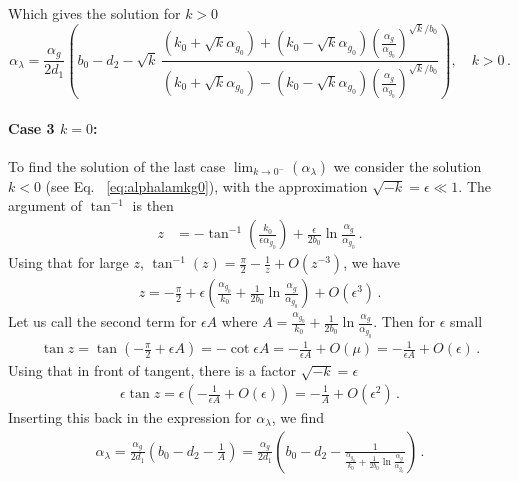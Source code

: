 Which gives the solution for $k>0$
\begin{equation}
    \boxed{\alpha_{\lambda} = \frac{\alpha_g}{2d_1} \left( b_0 - d_2 - \sqrt{k} \, \frac{ (k_0 + \sqrt{k}\alpha_{g_0}) + (k_0 - \sqrt{k}\alpha_{g_0}) \left( \frac{\alpha_g}{\alpha_{g_0}} \right)^{\sqrt{k}/b_0} }{ (k_0 + \sqrt{k}\alpha_{g_0}) - (k_0 - \sqrt{k}\alpha_{g_0}) \left( \frac{\alpha_g}{\alpha_{g_0}} \right)^{\sqrt{k}/b_0} } \right) , \quad k>0 \,.}
    \label{eq:appalphalamkg0}
\end{equation}



\paragraph{Case 3 $k = 0$:}
To find the solution of the last case $\lim_{k \to 0^-}(\alpha_\lambda)$ we consider the solution $k<0$ (see Eq.~ \eqref{eq:alphalamkg0}), with the approximation $\sqrt{-k} =\epsilon\ll1$. The argument of $\tan^{-1}$ is then
\begin{align}
z &= -\tan^{-1}\left( \frac{k_0}{\epsilon\alpha_{g_0}} \right) + \frac{\epsilon}{2b_0} \ln\frac{\alpha_g}{\alpha_{g_0}} \,.
\end{align}
Using that for large $z$, $\tan^{-1}(z) = \frac{\pi}{2} - \frac{1}{z} + O(z^{-3})$, we have
\begin{align}
z = -\frac{\pi}{2} +\epsilon\left( \frac{\alpha_{g_0}}{k_0} + \frac{1}{2b_0}\ln\frac{\alpha_g}{\alpha_{g_0}}\right) + O(\epsilon^3) \,.
\end{align}
Let us call the second term for $\epsilon A$ where $A = \frac{\alpha_{g_0}}{k_0} + \frac{1}{2b_0}\ln\frac{\alpha_g}{\alpha_{g_0}}$. Then for $\epsilon$ small
\begin{align}
\tan z = \tan\left(-\frac{\pi}{2} + \epsilon A\right) = -\cot\epsilon A = -\frac{1}{\epsilon A} + O(\mu) = -\frac{1}{\epsilon A} + O(\epsilon) \,.
\end{align}
Using that in front of tangent, there is a factor $\sqrt {-k}=\epsilon$
\begin{align}
\epsilon \tan z = \epsilon \left( -\frac{1}{\epsilon A} + O(\epsilon) \right) = -\frac{1}{A} + O(\epsilon^2) \,.
\end{align}
Inserting this back in the expression for $\alpha_\lambda$, we find
\begin{align}
\alpha_{\lambda} = \frac{\alpha_g}{2d_1} \left( b_0 - d_2 - \frac{1}{A} \right) = \frac{\alpha_g}{2d_1} \left( b_0 - d_2 - \frac{1}{ \frac{\alpha_{g_0}}{k_0} + \frac{1}{2b_0}\ln\frac{\alpha_g}{\alpha_{g_0}} } \right) \,.
\end{align}

